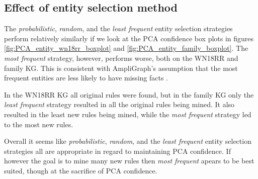 \fi

\newpage
\subsection{Effect of entity selection method}
The \textit{probabilistic}, \textit{random}, and the \textit{least frequent} entity selection strategies perform relatively similarly if we look at the PCA confidence box plots in figures \ref{fig:PCA_entity_wn18rr_boxplot} and \ref{fig:PCA_entity_family_boxplot}. The \textit{most frequent} strategy, however, performs worse, both on the WN18RR and family KG. This is consistent with AmpliGraph's assumption that the most frequent entities are less likely to have missing facts \cite{kge_tutorial}.

In the WN18RR KG all original rules were found, but in the family KG only the \textit{least frequent} strategy resulted in all the original rules being mined. It also resulted in the least new rules being mined, while the \textit{most frequent} strategy led to the most new rules.

Overall it seems like \textit{probabilistic}, \textit{random}, and the \textit{least frequent} entity selection strategies all are appropriate in regard to maintaining PCA confidence. If however the goal is to mine many new rules then \textit{most frequent} apears to be best suited, though at the sacrifice of PCA confidence.

